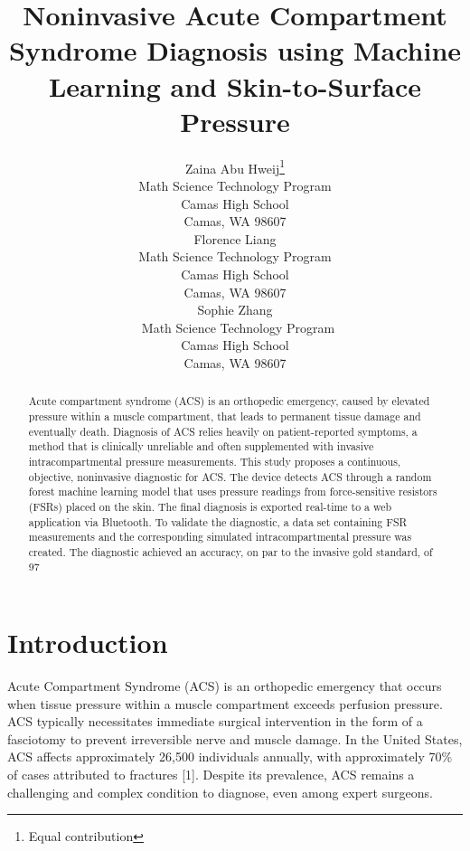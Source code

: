 \documentclass{article}
\title{Noninvasive Acute Compartment Syndrome Diagnosis using Machine Learning and Skin-to-Surface Pressure}
\author{
 Zaina Abu Hweij\thanks{Equal contribution}\\
  Math Science Technology Program\\
  Camas High School\\
  Camas, WA 98607\\
   \And
 Florence Liang\footnotemark[1]\\
  Math Science Technology Program\\
  Camas High School\\
  Camas, WA 98607\\
  \And
 Sophie Zhang\footnotemark[1]\\\
  Math Science Technology Program\\
  Camas High School \\
  Camas, WA 98607 \\
}
\begin{document}
\maketitle
\begin{abstract}
Acute compartment syndrome (ACS) is an orthopedic emergency, caused by elevated pressure within a muscle compartment, that leads to permanent tissue damage and eventually death. Diagnosis of ACS relies heavily on patient-reported symptoms, a method that is clinically unreliable and often supplemented with invasive intracompartmental pressure measurements. This study proposes a continuous, objective, noninvasive diagnostic for ACS. The device detects ACS through a random forest machine learning model that uses pressure readings from force-sensitive resistors (FSRs) placed on the skin. The final diagnosis is exported real-time to a web application via Bluetooth. To validate the diagnostic, a data set containing FSR measurements and the corresponding simulated intracompartmental pressure was created. The diagnostic achieved an accuracy, on par to the invasive gold standard, of 97%
\end{abstract}




\section{Introduction}
Acute Compartment Syndrome (ACS) is an orthopedic emergency that occurs when tissue pressure within a muscle compartment exceeds perfusion pressure. ACS typically necessitates immediate surgical intervention in the form of a fasciotomy to prevent irreversible nerve and muscle damage. In the United States, ACS affects approximately 26,500 individuals annually, with approximately 70\% of cases attributed to fractures [1]. Despite its prevalence, ACS remains a challenging and complex condition to diagnose, even among expert surgeons.
 
\end{document}
